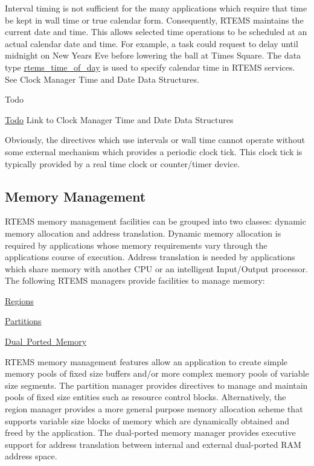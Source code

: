 Interval timing is not sufficient for the many applications which require that time be kept in wall time or true calendar form. Consequently, R\+T\+E\+MS maintains the current date and time. This allows selected time operations to be scheduled at an actual calendar date and time. For example, a task could request to delay until midnight on New Year\textquotesingle{}s Eve before lowering the ball at Times Square. The data type \mbox{\hyperlink{structrtems__time__of__day}{rtems\+\_\+time\+\_\+of\+\_\+day}} is used to specify calendar time in R\+T\+E\+MS services. See Clock Manager Time and Date Data Structures.

\begin{DoxyRefDesc}{Todo}
\item[\mbox{\hyperlink{todo__todo000006}{Todo}}]Link to Clock Manager Time and Date Data Structures\end{DoxyRefDesc}


Obviously, the directives which use intervals or wall time cannot operate without some external mechanism which provides a periodic clock tick. This clock tick is typically provided by a real time clock or counter/timer device.\hypertarget{group__RTEMSAPIClassic_ClassicRTEMSSecMemoryManagement}{}\subsection{Memory Management}\label{group__RTEMSAPIClassic_ClassicRTEMSSecMemoryManagement}
R\+T\+E\+MS memory management facilities can be grouped into two classes\+: dynamic memory allocation and address translation. Dynamic memory allocation is required by applications whose memory requirements vary through the application\textquotesingle{}s course of execution. Address translation is needed by applications which share memory with another C\+PU or an intelligent Input/\+Output processor. The following R\+T\+E\+MS managers provide facilities to manage memory\+:


\begin{DoxyItemize}
\item \mbox{\hyperlink{group__ClassicRegion}{Regions}}
\item \mbox{\hyperlink{group__ClassicPart}{Partitions}}
\item \mbox{\hyperlink{group__ClassicDPMEM}{Dual Ported Memory}}
\end{DoxyItemize}

R\+T\+E\+MS memory management features allow an application to create simple memory pools of fixed size buffers and/or more complex memory pools of variable size segments. The partition manager provides directives to manage and maintain pools of fixed size entities such as resource control blocks. Alternatively, the region manager provides a more general purpose memory allocation scheme that supports variable size blocks of memory which are dynamically obtained and freed by the application. The dual-\/ported memory manager provides executive support for address translation between internal and external dual-\/ported R\+AM address space. 

